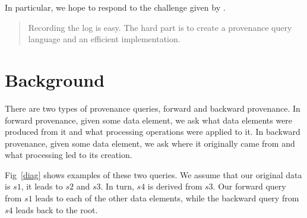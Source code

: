 \documentclass[11pt]{article}
\begin{document}
In particular, we hope to respond to the challenge given by \cite{cudré2009demonstration}.

\begin{quote}
Recording the log is easy. The hard part is to create a provenance query language and an efficient implementation.  
\end{quote}

\section{Background}

% 
% 
% 
% 
% 
% 


There are two types of provenance queries, forward and backward provenance. In forward provenance, given some data element, we ask what data elements were produced from it and what processing operations were applied to it. In backward provenance, given some data element, we ask where it originally came from and what processing led to its creation. 

Fig~\ref{diag} shows examples of these two queries. We assume that our original data is $s1$, it leads to $s2$ and $s3$. In turn, $s4$ is derived from $ s3$. Our forward query from $ s1$ leads to each of the other data elements, while the backward query from  $s4$ leads back to the root.  
\end{document}
